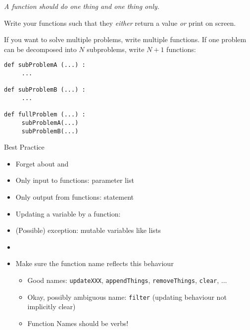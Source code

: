 
\begin{frame}[fragile]
%
\vspace{-3pt}
\begin{hintbox}
\emph{A function should do one thing and one thing only.}

\vspace{6pt}
Write your functions such that they \emph{either} return a value \emph{or} print on screen.

\vspace{6pt}
If you want to solve multiple problems, write multiple functions. If one problem can be decomposed into $N$ subproblems, write $N+1$ functions:

\begin{codebox}
\begin{verbatim}
def subProblemA (...) :
     ...
   
def subProblemB (...) :
     ...
   
def fullProblem (...) :
     subProblemA(...)
     subProblemB(...) 
\end{verbatim}
\end{codebox}
\end{hintbox}
%
\end{frame}


\begin{frame}{Best Practice}
%
\begin{itemize}
\item Forget about  and 
\item Only input to functions: parameter list
\item Only output from functions:  statement
\item Updating a variable by a function: 
\item (Possible) exception: mutable variables like lists
\item {}
\item Make sure the function name reflects this behaviour
	\begin{itemize}
	\item Good names: \texttt{updateXXX}, \texttt{appendThings}, \texttt{removeThings}, \texttt{clear}, ...
	\item Okay, possibly ambiguous name: \texttt{filter} (updating behaviour not implicitly clear)
	\item[\Thus] Function Names should be verbs!
	\end{itemize}
\end{itemize}
%
\end{frame}
